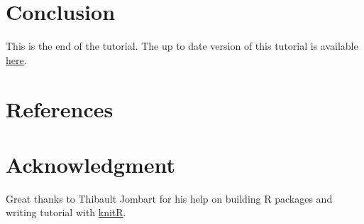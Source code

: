 \documentclass[12pt]{article}\usepackage[]{graphicx}\usepackage[]{color}
\begin{document}
\section*{Conclusion}
This is the end of the tutorial. The up to date version of this tutorial is available \href{https://github.com/adrientaudiere/cati/blob/Package-cati/Documentation/vignette_Darwin_finches/vignette.pdf}{here}.

\section*{References}

\section*{Acknowledgment}
Great thanks to Thibault Jombart for his help on building R packages and writing tutorial with \href{http://yihui.name/knitr/}{knitR}.
\end{document}
